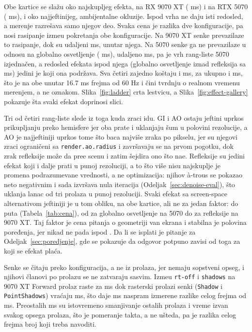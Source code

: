 Obe kartice se sla\v{z}u oko najskupljeg efekta, \perfTopEffectAMD{} na RX 9070 XT
(\perfEffShadowsAMD{} ms) i \perfTopEffectNV{} na RTX 5070 (\perfEffShadowsNV{} ms), i oko
najjeftinijeg, ambijentalne okluzije. Ispod vrha ne daju isti redosled, a merenje
razre\v{s}ava samo njegov deo. Svaka cena je razlika dve konfiguracije, pa nosi rasipanje izme\dj{}u
pokretanja obe konfiguracije. Na 9070 XT senke prevazilaze to rasipanje, dok su
\perfUnresolvedAMD{} udaljeni \perfUnresolvedGapAMD{} ms, unutar njega. Na 5070 senke ga ne prevazilaze
u odnosu na globalno osvetljenje (\perfEffGiNV{} ms), udaljeno \perfUnresolvedGapNV{} ms, pa je
vrh rang-liste 5070 izjedna\v{c}en, a redosled efekata ispod njega (globalno osvetljenje iznad
refleksija sa \perfEffReflNV{} ms) jedini je koji ona podr\v{z}ava. Sva \v{c}etiri zajedno ko\v{s}taju \perfFourEffectsAMD{} i
\perfFourEffectsNV{} ms, za ukupno \perfTotalAMD{} i \perfTotalNV{} ms, \v{s}to je na obe unutar
16.7 ms frejma od 60 Hz i \v{c}ini tvrdnju o realnom vremenu merenjem, a ne oznakom.
Slika~\ref{fig:ladder} crta lestvicu, a Slika~\ref{fig:effect-gallery} pokazuje \v{s}ta svaki efekat
doprinosi slici.

Tri od \v{c}etiri rang-liste slede iz toga kuda zraci idu. GI i AO ostaju jeftini uprkos prikupljanju preko
hemisfere jer oba prate i uklanjaju \v{s}um u polovini rezolucije, a AO je najjeftiniji uprkos tome \v{s}to
baca najvi\v{s}e zraka po pikselu, jer su njegovi zraci ograni\v{c}eni sa \texttt{render.ao.radius} i
zavr\v{s}avaju se na prvom pogotku, dok zrak refleksije mo\v{z}e da pre\dj e scenu i zatim \v{s}ejdira ono \v{s}to na\dj e.
Refleksije su jedini efekat koji i dalje prati u punoj rezoluciji, a to \v{s}to vi\v{s}e nisu najskuplje
je promena podrazumevane vrednosti, a ne optimizacija: njihov à-trous se pokazao neto negativnim i
sada izvr\v{s}ava nula iteracija (Odeljak~\ref{sec:denoise-eval}), \v{s}to uklanja lanac od tri prolaza u punoj rezoluciji. Svaki efekat sa screen-space alternativom jeftiniji je u tom obliku, na obe kartice, ali ne
za jedan faktor: \perfSsFactorMin{} do \perfSsFactorMax{} puta (Tabela~\ref{tab:cena}), od
\perfSsFactorGiNV{} za globalno osvetljenje na 5070 do \perfSsFactorReflAMD{} za refleksije na
9070 XT. Taj faktor je cena pitanja o geometriji van ekrana i stabilna je polovina
poređenja, jer nikad ne pada ispod \perfSsFactorMin{}. Da li se isplati
je pitanje za Odeljak~\ref{sec:poredjenje}, gde se pokazuje da odgovor potpuno zavisi od toga za koji se
efekat pla\'ca.

Senke se \v{c}itaju preko konfiguracija, a ne iz prolaza, jer nemaju sopstveni opseg, i
njihovi \v{c}lanovi po prolazu se ne zatvaraju sasvim. Izme\dj{}u \texttt{rt-off} i \texttt{shadows} na 9070 XT
Forward prolaz raste za \perfFwdGrowAMD{} ms dok rasterski prolazi senki (\texttt{Shadow} i
\texttt{PointShadows}) vra\'caju \perfShadowMapsAMD{} ms, \v{s}to daje \perfPassNetAMD{} ms naspram izmerene
razlike celog frejma od \perfEffShadowsAMD{} ms. Preostalih \perfPassResidAMD{} ms su istovremeno smanjivanje ostalih
prolaza i vreme izvan svakog opsega prolaza, \v{s}to je pomeranje takta, a ne
u\v{s}teda, pa je razlika celog frejma broj koji treba navoditi.

